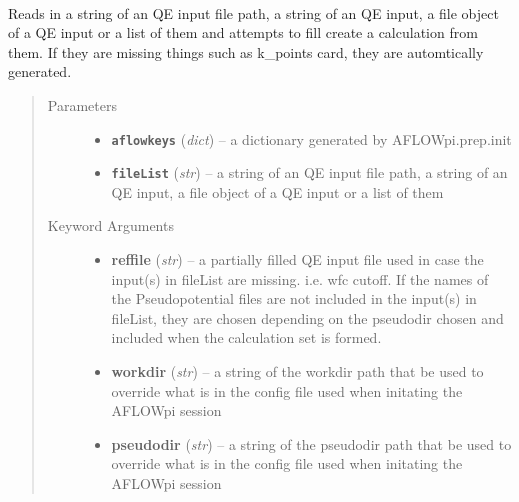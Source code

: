 \documentclass[letterpaper,10pt,english]{sphinxmanual}
\begin{document}
\begin{fulllineitems}
\label{prep:prep.init}~

\begin{fulllineitems}
\label{prep:prep.init.from_file}
Reads in a string of an QE input file path, a string of an QE input, a file object of a
QE input or a list of them and attempts to fill create a calculation from them. If they
are missing things such as k\_points card, they are automtically generated.
\begin{quote}\begin{description}
\item[{Parameters}] \leavevmode\begin{itemize}
\item {} 
\textbf{\texttt{aflowkeys}} (\emph{dict}) -- a dictionary generated by AFLOWpi.prep.init

\item {} 
\textbf{\texttt{fileList}} (\emph{str}) -- a string of an QE input file path, a string of an QE input, a file
object of a QE input or a list of them

\end{itemize}

\item[{Keyword Arguments}] \leavevmode\begin{itemize}
\item {} 
\textbf{reffile} (\emph{str}) --
a partially filled QE input file used in case the input(s) in fileList
are missing. i.e. wfc cutoff. If the names of the Pseudopotential files
are not included in the input(s) in fileList, they are chosen depending
on the pseudodir chosen and included when the calculation set is formed.

\item {} 
\textbf{workdir} (\emph{str}) --
a string of the workdir path that be used to override what is in the
config file used when initating the AFLOWpi session

\item {} 
\textbf{pseudodir} (\emph{str}) --
a string of the pseudodir path that be used to override what is in
the config file used when initating the AFLOWpi session


\end{itemize}
\end{description}
\end{quote}
\end{fulllineitems}
\end{fulllineitems}
\end{document}
